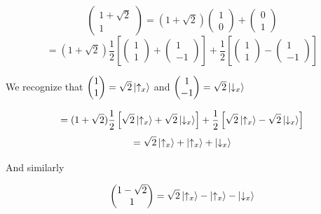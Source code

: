 \documentclass[a4paper,norsk, 10pt]{article}
\begin{document}
\begin{equation*}
\begin{pmatrix}
1 + \sqrt{2} \\ 1
\end{pmatrix}
= (1+\sqrt{2})
\begin{pmatrix}
1\\0
\end{pmatrix}
+
\begin{pmatrix}
0\\1
\end{pmatrix}
\end{equation*}
\begin{equation*}
=(1+\sqrt{2})
\frac{1}{2}\left[
\begin{pmatrix}
1\\1
\end{pmatrix}
+\begin{pmatrix}
1\\-1
\end{pmatrix}
\right]
+
\frac{1}{2}
\left[
\begin{pmatrix}
1\\1
\end{pmatrix}
-\begin{pmatrix}
1\\-1
\end{pmatrix}
\right]
\end{equation*}


We recognize that $\begin{pmatrix} 1\\1 \end{pmatrix} = \sqrt{2}\ket{\uparrow_x}$ and $\begin{pmatrix} 1\\-1 \end{pmatrix} = \sqrt{2}\ket{\downarrow_x}$


\begin{equation*}
= (1+\sqrt{2})
\frac{1}{2}\left[
\sqrt{2}\ket{\uparrow_x}
+\sqrt{2}\ket{\downarrow_x}
\right]
+
\frac{1}{2}
\left[
\sqrt{2}\ket{\uparrow_x}
-\sqrt{2}\ket{\downarrow_x}
\right]
\end{equation*}
\begin{equation}
= \sqrt{2}\ket{\uparrow_x} + \ket{\uparrow_x} + \ket{\downarrow_x}
\end{equation}

And similarly

\begin{equation}
\begin{pmatrix}
1 - \sqrt{2} \\ 1
\end{pmatrix}
= \sqrt{2}\ket{\uparrow_x} - \ket{\uparrow_x} - \ket{\downarrow_x}
\end{equation}
\end{document}
